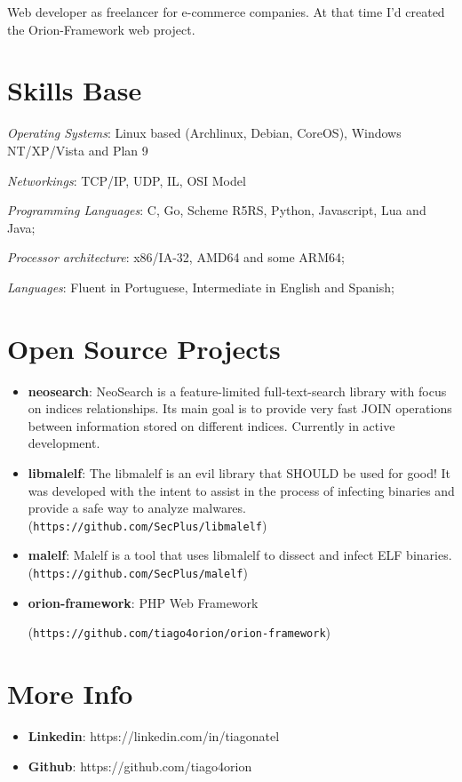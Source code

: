 \documentclass[margin]{res}
\begin{document}
\begin{resume}
   Web developer as freelancer for e-commerce companies. At that time I'd created the Orion-Framework web project.



\section{Skills Base}  \textit{Operating Systems}:  Linux based (Archlinux, Debian, CoreOS), Windows NT/XP/Vista and Plan 9

			\textit{Networkings}: TCP/IP, UDP, IL, OSI Model
  
			\textit{Programming Languages}: C, Go, Scheme R5RS, Python, Javascript, Lua and Java;
  
			\textit{Processor architecture}:  x86/IA-32, AMD64 and some ARM64;

			\textit{Languages}: Fluent in Portuguese, Intermediate in English and Spanish;
 
\section{Open Source Projects}
		\begin{itemize}
		    \vspace{2mm}
		    \item \textbf{neosearch}: NeoSearch is a feature-limited full-text-search library with focus on indices relationships. Its main goal is to provide very fast JOIN operations between information stored on different indices. Currently in active development.  \vspace{1mm}
		    \item \textbf{libmalelf}: The libmalelf is an evil library that SHOULD be used for good! It was developed
		                              with the intent to assist in the process of infecting binaries and provide a safe 
		                              way to analyze malwares. (\texttt{https://github.com/SecPlus/libmalelf})\vspace{1mm}
		                              
		    \item \textbf{malelf}: Malelf is a tool that uses libmalelf to dissect and infect ELF binaries. 
		                           (\texttt{https://github.com/SecPlus/malelf})
		 \item \textbf{orion-framework}: PHP Web Framework 
		 
		 	(\texttt{https://github.com/tiago4orion/orion-framework})
		
		\end{itemize}
 
\section{More Info}
    \begin{itemize}
        \item \textbf{Linkedin}: https://linkedin.com/in/tiagonatel
         \item \textbf{Github}: https://github.com/tiago4orion
    \end{itemize}


\end{resume} 
\end{document}

